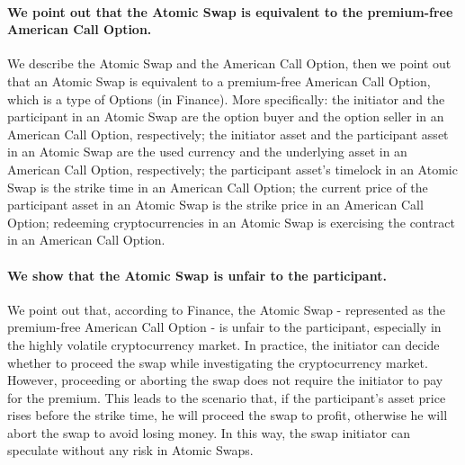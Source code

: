 \paragraph{We point out that the Atomic Swap is equivalent to the premium-free American Call Option.}
We describe the Atomic Swap and the American Call Option,
then we point out that an Atomic Swap is equivalent to a premium-free American Call Option, which is a type of Options (in Finance).
More specifically:
the initiator and the participant in an Atomic Swap are the option buyer and the option seller in an American Call Option, respectively;
the initiator asset and the participant asset in an Atomic Swap are the used currency and the underlying asset in an American Call Option, respectively;
the participant asset's timelock in an Atomic Swap is the strike time in an American Call Option;
the current price of the participant asset in an Atomic Swap is the strike price in an American Call Option;
redeeming cryptocurrencies in an Atomic Swap is exercising the contract in an American Call Option.

\paragraph{We show that the Atomic Swap is unfair to the participant.}
We point out that, according to Finance, the Atomic Swap - represented as the premium-free American Call Option - is unfair to the participant, especially in the highly volatile cryptocurrency market.
In practice, the initiator can decide whether to proceed the swap while investigating the cryptocurrency market.
However, proceeding or aborting the swap does not require the initiator to pay for the premium.
This leads to the scenario that, if the participant's asset price rises before the strike time, he will proceed the swap to profit, otherwise he will abort the swap to avoid losing money.
In this way, the swap initiator can speculate without any risk in Atomic Swaps.

